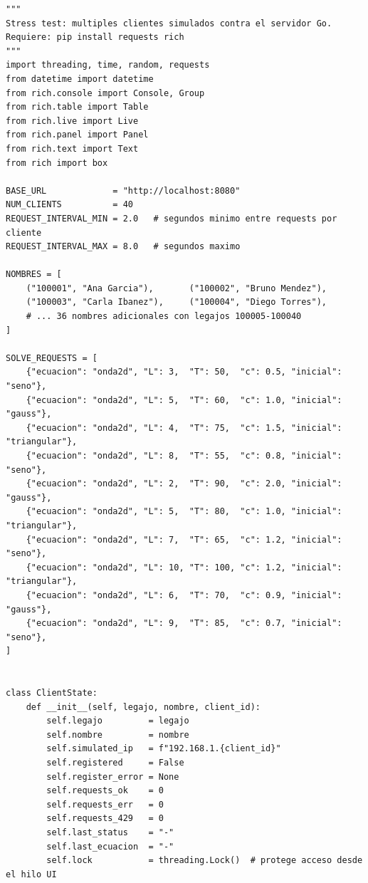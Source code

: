 \documentclass[12pt, a4paper]{article}
\begin{document}
\begin{lstlisting}[style=python, caption={Configuración y estado de los clientes simulados}, label=lst:stress]
"""
Stress test: multiples clientes simulados contra el servidor Go.
Requiere: pip install requests rich
"""
import threading, time, random, requests
from datetime import datetime
from rich.console import Console, Group
from rich.table import Table
from rich.live import Live
from rich.panel import Panel
from rich.text import Text
from rich import box

BASE_URL             = "http://localhost:8080"
NUM_CLIENTS          = 40
REQUEST_INTERVAL_MIN = 2.0   # segundos minimo entre requests por cliente
REQUEST_INTERVAL_MAX = 8.0   # segundos maximo

NOMBRES = [
    ("100001", "Ana Garcia"),       ("100002", "Bruno Mendez"),
    ("100003", "Carla Ibanez"),     ("100004", "Diego Torres"),
    # ... 36 nombres adicionales con legajos 100005-100040
]

SOLVE_REQUESTS = [
    {"ecuacion": "onda2d", "L": 3,  "T": 50,  "c": 0.5, "inicial": "seno"},
    {"ecuacion": "onda2d", "L": 5,  "T": 60,  "c": 1.0, "inicial": "gauss"},
    {"ecuacion": "onda2d", "L": 4,  "T": 75,  "c": 1.5, "inicial": "triangular"},
    {"ecuacion": "onda2d", "L": 8,  "T": 55,  "c": 0.8, "inicial": "seno"},
    {"ecuacion": "onda2d", "L": 2,  "T": 90,  "c": 2.0, "inicial": "gauss"},
    {"ecuacion": "onda2d", "L": 5,  "T": 80,  "c": 1.0, "inicial": "triangular"},
    {"ecuacion": "onda2d", "L": 7,  "T": 65,  "c": 1.2, "inicial": "seno"},
    {"ecuacion": "onda2d", "L": 10, "T": 100, "c": 1.2, "inicial": "triangular"},
    {"ecuacion": "onda2d", "L": 6,  "T": 70,  "c": 0.9, "inicial": "gauss"},
    {"ecuacion": "onda2d", "L": 9,  "T": 85,  "c": 0.7, "inicial": "seno"},
]


class ClientState:
    def __init__(self, legajo, nombre, client_id):
        self.legajo         = legajo
        self.nombre         = nombre
        self.simulated_ip   = f"192.168.1.{client_id}"
        self.registered     = False
        self.register_error = None
        self.requests_ok    = 0
        self.requests_err   = 0
        self.requests_429   = 0
        self.last_status    = "-"
        self.last_ecuacion  = "-"
        self.lock           = threading.Lock()  # protege acceso desde el hilo UI
\end{lstlisting}
\end{document}
